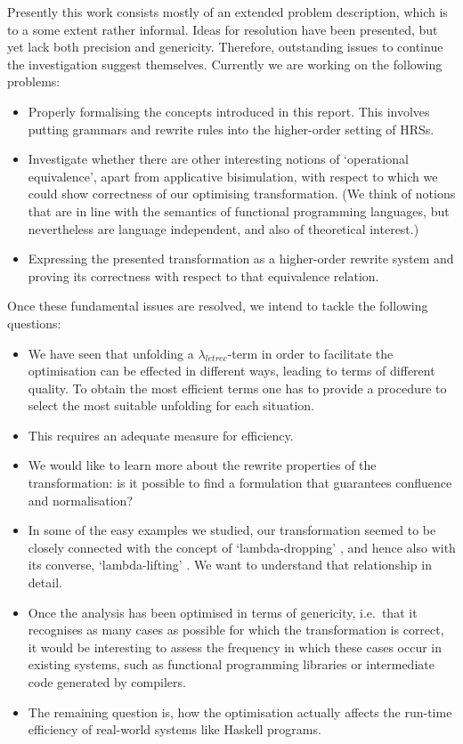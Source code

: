\documentclass[submission,copyright,creativecommons]{eptcs}
\newcommand{\lambdaletrec}{\ensuremath{\lambda_\textit{letrec}}}
\renewcommand\;{\,}
\begin{document}
Presently this work consists mostly of an extended problem description, which
is to a some extent rather informal. Ideas for resolution have been presented,
but yet lack both precision and genericity. Therefore, outstanding issues to
continue the investigation suggest themselves. Currently we are working on the
following problems:
\begin{itemize}
  \item Properly formalising the concepts introduced in this report. This
  involves putting grammars and rewrite rules into the higher-order setting of HRSs. 
  \item Investigate whether there are other interesting notions 
  of `operational equivalence', apart from applicative bisimulation,
  with respect to which we could show correctness of our optimising transformation.
  (We think of notions that are in line with the semantics of
   functional programming languages, but nevertheless are language independent,
   and also of theoretical interest.)
\item Expressing the presented transformation as a higher-order rewrite
  system and proving its correctness with respect to that equivalence relation.
\end{itemize}

Once these fundamental issues are resolved, we intend to tackle the following questions: \begin{itemize}
  \item We have seen that unfolding a \lambdaletrec-term in order to facilitate
  the optimisation can be effected in different ways, leading to terms of
  different quality. To obtain the most efficient terms one has to provide a
  procedure to select the most suitable unfolding for each situation.
  \item This requires an adequate measure for efficiency.
  \item We would like to learn more about the rewrite properties of the transformation:
    is it possible to find a formulation that guarantees confluence and normalisation?
\item In some of the easy examples we studied, our transformation seemed to be
    closely connected with the concept of `lambda-dropping' \cite{danv:schu:1997,danv:1999},
    and hence also with its converse, `lambda-lifting' \cite{john:1985,peyt:jone:1987,danv:schu:2002}.
    We want to understand that relationship in detail. 
\item Once the analysis has been optimised in terms of genericity, i.e.\ that
  it recognises as many cases as possible for which the transformation is
  correct, it would be interesting to assess the frequency in which these cases
  occur in existing systems, such as functional programming libraries or
  intermediate code generated by compilers.
  \item The remaining question is, how the optimisation actually affects the
  run-time efficiency of real-world systems like Haskell programs.
\end{itemize}
\end{document}
